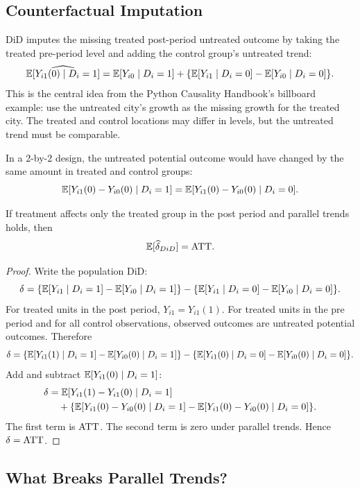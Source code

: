 \subsection{Counterfactual Imputation}

DiD imputes the missing treated post-period untreated outcome by taking the
treated pre-period level and adding the control group's untreated trend:
\[
    \widehat{\mathbb{E}[Y_{i1}(0)\mid D_i=1]}
    =
    \mathbb{E}[Y_{i0}\mid D_i=1]
    +
    \{\mathbb{E}[Y_{i1}\mid D_i=0]-\mathbb{E}[Y_{i0}\mid D_i=0]\}.
\]
This is the central idea from the Python Causality Handbook's billboard example:
use the untreated city's growth as the missing growth for the treated city. The
treated and control locations may differ in levels, but the untreated trend must
be comparable.

\begin{assN}
In a 2-by-2 design, the untreated potential outcome would have changed by the
same amount in treated and control groups:
\[
    \mathbb{E}[Y_{i1}(0)-Y_{i0}(0)\mid D_i=1]
    =
    \mathbb{E}[Y_{i1}(0)-Y_{i0}(0)\mid D_i=0].
\]
\end{assN}

\begin{thmN}
If treatment affects only the treated group in the post period and parallel
trends holds, then
\[
    \mathbb{E}[\widehat{\delta}_{DiD}] = \mathrm{ATT}.
\]
\end{thmN}

\begin{proof}
Write the population DiD:
\[
\delta =
\{\mathbb{E}[Y_{i1}\mid D_i=1]-\mathbb{E}[Y_{i0}\mid D_i=1]\}
-
\{\mathbb{E}[Y_{i1}\mid D_i=0]-\mathbb{E}[Y_{i0}\mid D_i=0]\}.
\]
For treated units in the post period, $Y_{i1}=Y_{i1}(1)$. For treated units in
the pre period and for all control observations, observed outcomes are untreated
potential outcomes. Therefore
\[
\delta =
\{\mathbb{E}[Y_{i1}(1)\mid D_i=1]-\mathbb{E}[Y_{i0}(0)\mid D_i=1]\}
-
\{\mathbb{E}[Y_{i1}(0)\mid D_i=0]-\mathbb{E}[Y_{i0}(0)\mid D_i=0]\}.
\]
Add and subtract $\mathbb{E}[Y_{i1}(0)\mid D_i=1]$:
\[
\begin{aligned}
\delta
&=
\mathbb{E}[Y_{i1}(1)-Y_{i1}(0)\mid D_i=1]\\
&\quad+
\{\mathbb{E}[Y_{i1}(0)-Y_{i0}(0)\mid D_i=1]
-
\mathbb{E}[Y_{i1}(0)-Y_{i0}(0)\mid D_i=0]\}.
\end{aligned}
\]
The first term is $\mathrm{ATT}$. The second term is zero under parallel trends. Hence
$\delta=\mathrm{ATT}$.
\end{proof}

\subsection{What Breaks Parallel Trends?}

